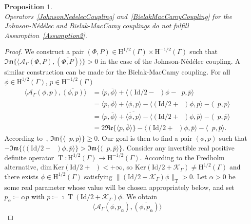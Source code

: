 \documentclass[a4paper,11pt]{article}
\newcommand{\mrm}{\mathrm}
\newcommand{\mH}{\mathrm{H}}
\newcommand{\Id}{\mathrm{Id}}
\newcommand{\mT}{\mathrm{T}}
\DeclareMathOperator{\T}{T} %
\DeclareMathOperator{\V}{\mathcal{V}_{\Gamma}} %
\DeclareMathOperator{\K}{\mathcal{K}_{\Gamma}} %
\newcommand{\Hdemi}{\mH^{1/2}(\Gamma)} %
\renewcommand{\Re}{\mathfrak{Re}} %
\renewcommand{\Im}{\mathfrak{Im}} %
\newtheorem{prop}[defn]{Proposition}
\begin{document}
\begin{prop}\label{prop:JN_sign_assumption}\quad\\
  Operators~\eqref{JohnsonNedelecCoupling} and~\eqref{BielakMacCamyCoupling} for the Johnson-N\'ed\'elec and
  Bielak-MacCamy couplings do \emph{not} fulfill
  Assumption~\eqref{Assumption2}.
\end{prop}
\begin{proof}
  We construct a pair \((\Phi, P) \in \Hdemi \times \mH^{-1/2}(\Gamma)\)
  such that \( \Im\{\langle\mathcal{A}_{\Gamma}(\Phi,P),
  (\overline{\Phi,P})\rangle\} > 0\) in the case of the 
  Johnson-Nédélec coupling. A similar construction can be made for the 
  Bielak-MacCamy coupling. For all \(\phi \in \Hdemi\), \(p \in
  \mH^{-1/2}(\Gamma)\)
  \begin{align*}
      \langle \mathcal{A}_{\Gamma}(\phi,p), \overline{(\phi,p)} \rangle 
      &= \langle p, \overline{\phi} \rangle +\langle (\Id/2 - \K) \phi - \V p, \overline{p} \rangle \\
      &= \langle p, \overline{\phi} \rangle + \langle \phi, \overline{p} \rangle -
      \langle (\Id/2 + \K) \phi, \overline{p} \rangle - \langle \V p, \overline{p} \rangle \\
      &= \langle p, \overline{\phi} \rangle + \overline{\langle \overline{\phi}, p \rangle} -
      \langle (\Id/2 + \K) \phi, \overline{p} \rangle - \langle \V p, \overline{p} \rangle \\
      &= 2\Re\{\langle p, \overline{\phi} \rangle\} - \langle (\Id/2 + \K) \phi, \overline{p} \rangle - \langle \V p, \overline{p} \rangle.
  \end{align*}
  According to~\cite[Lemma~3.1]{EnglederSteinbach2007MBI},
  \(\Im\{\langle \V p, \overline{p} \rangle\} \geq 0\). Our goal is
  then to find a pair $(\phi,p)$ such that \(-\Im \{\langle (\Id/2 + \K) \phi, \overline{p}
  \rangle\} > \Im\{\langle \V p, \overline{p} \rangle\} \).
  Consider any invertible real positive definite operator \(\T\colon\Hdemi
  \to \mH^{-1/2}(\Gamma)\).  According to the Fredholm alternative, \(\mrm{dim} \, \mrm{Ker}(\Id/2 + \K)<+\infty\), so $\mrm{Ker}(\Id/2 +
  \mathcal{K}_{\Gamma})\neq \Hdemi$ and there exists $\phi\in \Hdemi$ satisfying
  $\lVert (\Id/2 + \mathcal{K}_{\Gamma}) \phi \rVert_{\mT}>0$.
  Let $\alpha>0$ be some real parameter whose value will be
  chosen appropriately below, and set $p_{\alpha}\coloneqq \alpha p$
  with \( p\coloneqq\imath \T (\Id/2 + \mathcal{K}_{\Gamma}) \phi\). We obtain
  \begin{equation*}
      \langle\mathcal{A}_{\Gamma}(\phi,p_{\alpha}),( \overline{\phi, p_{\alpha}}) \rangle 

\end{equation*}
\end{proof}
\end{document}
